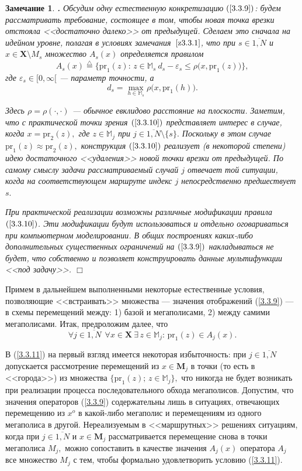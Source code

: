 \documentclass[11pt,twoside,openany]{report}
\newcommand{\bfn}{\begin{equation}}
\newcommand{\efn}{\end{equation}}
\newcommand{\df}{\stackrel{\triangle}{=}}
\newcommand{\ov}{\overline}
\newcounter{theo}
\newcounter{zam}
\newtheorem{zam}{Замечание}[section]
\newcommand{\TL}{\mbox{\bf{$\!\!$.}}}
\newcommand{\eps}{\varepsilon}
\newcommand{\sm}{\setminus}
\newcommand{\fa}{\forall}
\newcommand{\bbm}{{\mathbb M}}
\begin{document}
\begin{zam}
  \label{z3.3.2}{\TL}
Обсудим одну естественную конкретизацию $(\ref{3.3.9})$:
будем рассматривать
требование, состоящее в том, чтобы новая точка врезки отстояла <<достаточно далеко>>
от предыдущей.
Сделаем это сначала на идейном уровне,
полагая в условиях замечания~$\ref{z3.3.1}$,
что при $s\in \ov{1,N}$ и $x\in \mathbf{X}\sm M_s$
множество $A_s(x)$ определяется правилом
\bfn
  \label{3.3.10}
  A_s(x) \df \{\mathrm{pr}_1(z):\,z\in \bbm_s\
  d_s -\eps_s\leqslant\rho\bigl(x,\mathrm{pr}_1(z)\bigl)\},
\efn
где $\eps_s\in [0,\infty[$ --- параметр точности, а
$$
  d_s = \max\limits_{h\in \bbm_s}\rho\bigl(x,\mathrm{pr}_1(h)\bigl).
$$

Здесь
$\rho= \rho(\cdot,\cdot)$ --- обычное евклидово расстояние на
плоскости.
Заметим, что с практической точки зрения $(\ref{3.3.10})$
представляет интерес в случае, когда
$x = \mathrm{pr}_2(z),$
где $z\in \bbm_j$ при
$j\in \ov{1,N}\sm \{s\}.$
Поскольку в этом случае $\mathrm{pr}_1(z)\approx \mathrm{pr}_2(z),$
конструкция $(\ref{3.3.10})$
реализует (в некоторой степени) идею достаточного
<<удаления>> новой точки врезки от предыдущей.
По самому смыслу задачи
рассматриваемый случай $j$ отвечает той ситуации,
когда на соответствующем маршруте
индекс $j$ непосредственно предшествует $s.$

При практической реализации возможны различные модификации правила $(\ref{3.3.10})$.
Эти модификации будут использоваться и отдельно оговариваться при компьютерном
моделировании.
В общих построениях каких-либо дополнительных существенных ограничений
на $(\ref{3.3.9})$ накладываться не будет,
что собственно и позволяет конструировать
данные мультифункции <<под задачу>>.
\hfill $\Box$
\end{zam}

Примем
в дальнейшем выполненными некоторые естественные условия,
позволяющие <<встраивать>> множества --- значения отображений (\ref{3.3.9}) ---
в схемы перемещений между:
1) базой и мегаполисами,
2) между самими мегаполисами.
Итак, предроложим далее, что
\bfn
  \label{3.3.11}
  \fa j\in\ov{1,N}\ \ \fa x \in \mathbf{X}\ \exists\, z\in
  \bbm_j:\,\mathrm{pr}_1(z)\in A_j(x).
\efn

В (\ref{3.3.11}) на первый взгляд имеется некоторая избыточность:
при $j\in\ov{1,N}$
допускается рассмотрение перемещений из
$x\in \mathbf{M}_j$ в точки
(то есть в <<города>>)
из множества $\{\mathrm{pr}_1(z);\, z\in \bbm_j\},$
что никогда не будет возникать при реализации процесса последовательного обхода мегаполисов.
Допустим,
что значения операторов (\ref{3.3.9})
содержательны лишь в
ситуациях, отвечающих перемещению из $x^o$ в какой-либо мегаполис и перемещениям
из одного мегаполиса в другой.
Нереализуемым в <<маршрутных>> решениях ситуациям,
когда при
$j\in \ov{1,N}$ и $x\in \mathbf{M}_j$
рассматривается перемещение снова
в точки мегаполиса $M_j,$ можно сопоставить в качестве значения
$A_j(x)$ оператора
$A_j$ все множество $M_j$ с тем,
чтобы формально удовлетворить условию (\ref{3.3.11}).
\end{document}
